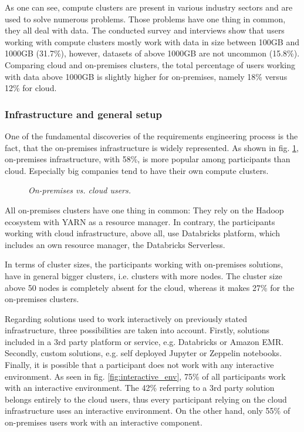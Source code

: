 \documentclass[a4paper,twoside]{article}
\begin{document}
As one can see, compute clusters are present in various industry sectors and are used to solve numerous problems. Those problems have one thing in common, they all deal with data. The conducted survey and interviews show that users working with compute clusters mostly work with data in size between 100GB and 1000GB (31.7\%), however, datasets of above 1000GB are not uncommon (15.8\%). Comparing cloud and on-premises clusters, the total
percentage of users working with data above 1000GB is slightly higher for on-premises, namely 18\% versus 12\% for cloud.

\subsubsection{Infrastructure and general setup}

One of the fundamental discoveries of the requirements engineering process is the fact, that the on-premises infrastructure is widely represented. As shown in fig. \ref{fig:on_prem_vs_cloud}, on-premises infrastructure, with 58\%, is more popular among participants than cloud. Especially big companies tend to have their own compute clusters. 

\begin{figure}[!h]
  \centering
   {}
  \caption{\textit{On-premises vs. cloud users.}}
  \label{fig:on_prem_vs_cloud}
\end{figure}

All on-premises clusters have one thing in common: They rely on the Hadoop ecosystem with YARN as a resource manager. In contrary, the participants working with cloud infrastructure, above all, use Databricks platform, which includes an own resource manager, the Databricks Serverless.

In terms of cluster sizes, the participants working with on-premises solutions, have in general bigger clusters, i.e. clusters with more nodes. The cluster size above 50 nodes is completely absent for the cloud, whereas it makes 27\% for the on-premises clusters. 

Regarding solutions used to work interactively on previously stated infrastructure, three possibilities are taken into account. Firstly, solutions included in a 3rd party platform or service, e.g. Databricks or Amazon EMR. Secondly, custom solutions, e.g. self deployed Jupyter or Zeppelin notebooks. Finally, it is possible that a participant does not work with any interactive environment. As seen in fig. \ref{fig:interactive_env}, 75\% of all participants work with an interactive environment. The 42\% referring to a 3rd party solution belongs entirely to the cloud users, thus every participant relying on the cloud infrastructure uses an interactive environment. On the other hand, only 55\% of on-premises users work with an interactive component. 
\end{document}
